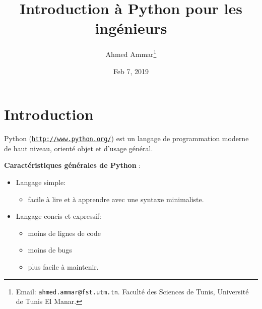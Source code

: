 \documentclass[%
oneside,                 %
final,                   %
10pt,french]{article}
\begin{document}

\newcommand{\exercisesection}[1]{\subsection*{#1}}






\title{Introduction à Python pour les ingénieurs}


\author{Ahmed Ammar\footnote{Email: \texttt{ahmed.ammar@fst.utm.tn}. Faculté des Sciences de Tunis, Université de Tunis El Manar.}}


\date{Feb 7, 2019}
\maketitle

\tableofcontents


\vspace{1cm} %




\section{Introduction}

Python (\href{{http://www.python.org/}}{\nolinkurl{http://www.python.org/}}) est un langage de programmation moderne de haut niveau, orienté objet et d'usage général.

\textbf{Caractéristiques générales de Python} :

\begin{itemize}
\item Langage simple:
\begin{itemize}

  \item facile à lire et à apprendre avec une syntaxe minimaliste.

\end{itemize}

\noindent
\item Langage concis et expressif:
\begin{itemize}

  \item moins de lignes de code

  \item moins de bugs

  \item plus facile à maintenir.
\end{itemize}

\noindent
\end{itemize}
\end{document}
